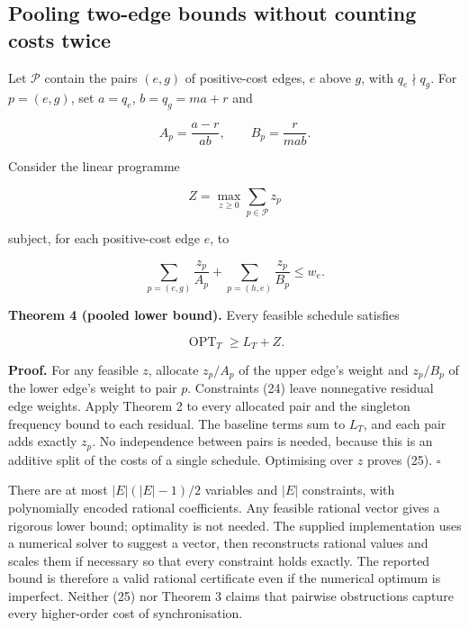 \documentclass[
  british,
  11pt,
  a4paper,
]{article}
\begin{document}
\subsection{Pooling two-edge bounds without counting costs
twice}\label{pooling-two-edge-bounds-without-counting-costs-twice}

Let \(\mathcal P\) contain the pairs \((e,g)\) of positive-cost edges,
\(e\) above \(g\), with \(q_e\nmid q_g\). For \(p=(e,g)\), set
\(a=q_e\), \(b=q_g=ma+r\) and

\[
A_p=\frac{a-r}{ab},\qquad B_p=\frac r{mab}. \tag{22}
\]

Consider the linear programme

\[
Z=\max_{z\ge0}\sum_{p\in\mathcal P}z_p \tag{23}
\]

subject, for each positive-cost edge \(e\), to

\[
\sum_{p=(e,g)}\frac{z_p}{A_p}
+\sum_{p=(h,e)}\frac{z_p}{B_p}\le w_e. \tag{24}
\]

\textbf{Theorem 4 (pooled lower bound).} Every feasible schedule
satisfies

\[
\operatorname{OPT}_T\ge L_T+Z. \tag{25}
\]

\textbf{Proof.} For any feasible \(z\), allocate \(z_p/A_p\) of the
upper edge's weight and \(z_p/B_p\) of the lower edge's weight to pair
\(p\). Constraints (24) leave nonnegative residual edge weights. Apply
Theorem 2 to every allocated pair and the singleton frequency bound to
each residual. The baseline terms sum to \(L_T\), and each pair adds
exactly \(z_p\). No independence between pairs is needed, because this
is an additive split of the costs of a single schedule. Optimising over
\(z\) proves (25). \(\square\)

There are at most \(|E|(|E|-1)/2\) variables and \(|E|\) constraints,
with polynomially encoded rational coefficients. Any feasible rational
vector gives a rigorous lower bound; optimality is not needed. The
supplied implementation uses a numerical solver to suggest a vector,
then reconstructs rational values and scales them if necessary so that
every constraint holds exactly. The reported bound is therefore a valid
rational certificate even if the numerical optimum is imperfect. Neither
(25) nor Theorem 3 claims that pairwise obstructions capture every
higher-order cost of synchronisation.
\end{document}
